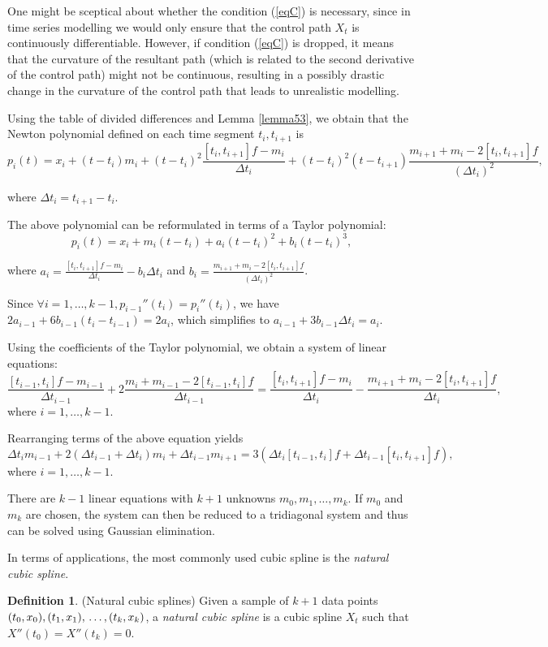 \documentclass[a4paper,11pt,titlepage]{article}
\theoremstyle{definition}
\newtheorem{definition}{Definition}[section]
\theoremstyle{plain}
\theoremstyle{remark}
\begin{document}
One might be sceptical about whether the condition (\ref{eqC}) is necessary, since in time series modelling we would only ensure that the control path $X_t$ is continuously differentiable. However, if condition (\ref{eqC}) is dropped, it means that the curvature of the resultant path (which is related to the second derivative of the control path) might not be continuous, resulting in a possibly drastic change in the curvature of the control path that leads to unrealistic modelling.

Using the table of divided differences and Lemma \ref{lemma53}, we obtain that the Newton polynomial defined on each time segment $t_i,t_{i+1}$ is
$$p_i(t)=x_i+(t-t_i)m_i+(t-t_i)^2\frac{[t_i,t_{i+1}]f-m_i}{\Delta t_i}+(t-t_i)^2(t-t_{i+1})\frac{m_{i+1}+m_i-2[t_i,t_{i+1}]f}{(\Delta t_i)^2},$$

where $\Delta t_i=t_{i+1}-t_i$.

The above polynomial can be reformulated in terms of a Taylor polynomial:
$$p_i(t)=x_i+m_i(t-t_i)+a_i(t-t_i)^2+b_i(t-t_i)^3,$$

where $\displaystyle a_i=\frac{[t_i,t_{i+1}]f-m_i}{\Delta t_i}-b_i\Delta t_i$ and $\displaystyle b_i=\frac{m_{i+1}+m_i-2[t_i,t_{i+1}]f}{(\Delta t_i)^2}$.

Since $\forall i=1,\dots,k-1, p_{i-1}''(t_i)=p_i''(t_i)$, we have $2a_{i-1}+6b_{i-1}(t_i-t_{i-1})=2a_i$, which simplifies to $a_{i-1}+3b_{i-1}\Delta t_i=a_i$.

Using the coefficients of the Taylor polynomial, we obtain a system of linear equations:
$$\frac{[t_{i-1},t_i]f-m_{i-1}}{\Delta t_{i-1}}+2\frac{m_i+m_{i-1}-2[t_{i-1},t_i]f}{\Delta t_{i-1}}=\frac{[t_i,t_{i+1}]f-m_i}{\Delta t_{i}}-\frac{m_{i+1}+m_{i}-2[t_{i},t_{i+1}]f}{\Delta t_{i}},$$
where $i=1,\dots,k-1$.

Rearranging terms of the above equation yields
$$\Delta t_im_{i-1}+2(\Delta t_{i-1}+\Delta t_i)m_i+\Delta t_{i-1}m_{i+1}=3(\Delta t_i[t_{i-1},t_i]f+\Delta t_{i-1}[t_i,t_{i+1}]f),$$
where $i=1,\dots,k-1$.

There are $k-1$ linear equations with $k+1$ unknowns $m_0,m_1,\dots,m_k$. If $m_0$ and $m_k$ are chosen, the system can then be reduced to a tridiagonal system and thus can be solved using Gaussian elimination.

In terms of applications, the most commonly used cubic spline is the \textit{natural cubic spline}.
\begin{definition}
    (Natural cubic splines) Given a sample of $k+1$ data points
$(t_0,x_0), (t_1,x_1), \\\dots, (t_k,x_k)$, a \textit{natural cubic spline} is a cubic spline $X_t$ such that $X''(t_0)=X''(t_k)=0$.
\end{definition}
\end{document}
